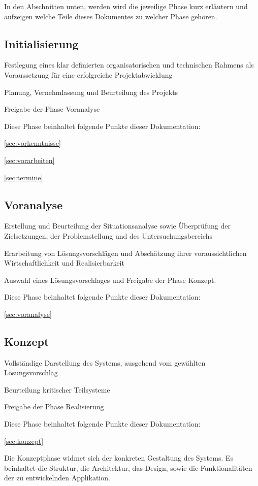 \documentclass[11pt,paper=a4,final]{scrartcl}
\begin{document}
In den Abschnitten unten, werden wird die jeweilige Phase kurz erläutern und
aufzeigen welche Teile dieses Dokumentes zu welcher Phase gehören.
\subsection{Initialisierung}
\begin{itemize*}
  \item Festlegung eines klar definierten organisatorischen und technischen
  Rahmens als Voraussetzung für eine erfolgreiche Projektabwicklung
  \item Planung, Vernehmlassung und Beurteilung des Projekts
  \item Freigabe der Phase Voranalyse
\end{itemize*}
Diese Phase beinhaltet folgende Punkte dieser Dokumentation:
\begin{itemize*}
  \item \ref{sec:vorkenntnisse} 
  \item \ref{sec:vorarbeiten} 
  \item \ref{sec:termine} 
\end{itemize*}
\subsection{Voranalyse}
\begin{itemize*}
  \item Erstellung und Beurteilung der Situationsanalyse sowie Überprüfung der
  Zielsetzungen, der Problemstellung und des Untersuchungsbereichs
  \item Erarbeitung von Lösungsvorschlägen und Abschätzung ihrer
  voraussichtlichen Wirtschaftlichkeit und Realisierbarkeit
  \item Auswahl eines Lösungsvorschlages und Freigabe der Phase Konzept.
\end{itemize*}
Diese Phase beinhaltet folgende Punkte dieser Dokumentation:
\begin{itemize*}
  \item \ref{sec:voranalyse} 
\end{itemize*}
\subsection{Konzept}
\begin{itemize*}
  \item Vollständige Darstellung des Systems, ausgehend vom gewählten Lösungsvorschlag
  \item Beurteilung kritischer Teilsysteme
  \item Freigabe der Phase \glqq Realisierung\grqq
\end{itemize*}
Diese Phase beinhaltet folgende Punkte dieser Dokumentation:
\begin{itemize*}
  \item \ref{sec:konzept} 
\end{itemize*}
Die Konzeptphase widmet sich der konkreten Gestaltung des Systems. Es beinhaltet
die Struktur, die Architektur, das Design, sowie die Funktionalitäten der zu
entwickelnden Applikation.
\end{document}
